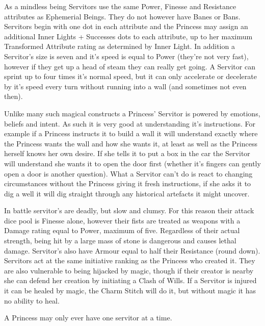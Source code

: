 As a mindless being Servitors use the same Power, Finesse and Resistance attributes as Ephemerial Beings. They do not however have Banes or Bans. Servitors begin with one dot in each attribute and the Princess may assign an additional Inner Lights + Successes dots to each attribute, up to her maximum Transformed Attribute rating as determined by Inner Light. In addition a Servitor's size is seven and it's speed is equal to Power (they're not very fast), however if they get up a head of steam they can really get going. A Servitor can sprint up to four times it's normal speed, but it can only accelerate or decelerate by it's speed every turn without running into a wall (and sometimes not even then).

Unlike many such magical constructs a Princess' Servitor is powered by emotions, beliefs and intent. As such it is very good at understanding it's instructions. For example if a Princess instructs it to build a wall it will understand exactly where the Princess wants the wall and how she wants it, at least as well as the Princess herself knows her own desire. If she tells it to put a box in the car the Servitor will understand she wants it to open the door first (whether it's fingers can gently open a door is another question). What a Servitor can't do is react to changing circumstances without the Princess giving it fresh instructions, if she asks it to dig a well it will dig straight through any historical artefacts it might uncover.

In battle servitor's are deadly, but slow and clumsy. For this reason their attack dice pool is Finesse alone, however their fists are treated as weapons with a Damage rating equal to Power, maximum of five. Regardless of their actual strength, being hit by a large mass of stone is dangerous and causes lethal damage. Servitor's also have Armour equal to half their Resistance (round down). Servitors act at the same initiative ranking as the Princess who created it. They are also vulnerable to being hijacked by magic, though if their creator is nearby she can defend her creation by initiating a Clash of Wills. If a Servitor is injured it can be healed by magic, the Charm Stitch will do it, but without magic it has no ability to heal.

A Princess may only ever have one servitor at a time.

